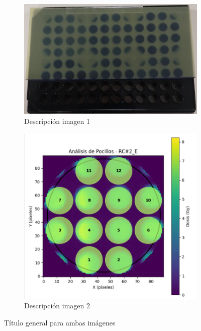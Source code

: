 \documentclass[onecolumn,12pt]{article} %
\begin{document}
\begin{figure}[H]
    \centering
    \begin{subfigure}[b]{0.45\textwidth}
        \centering
        \includegraphics[width=\textwidth]{img_exp/pocillosconRC.png}
        \caption{Descripción imagen 1}
        \label{fig:img1}
    \end{subfigure}
    \hfill
    \begin{subfigure}[b]{0.5\textwidth}
        \centering
        \includegraphics[width=\textwidth]{img_exp/AnaPocillos.png}
        \caption{Descripción imagen 2}
        \label{fig:img2}
    \end{subfigure}
    \caption{Título general para ambas imágenes}
    \label{fig:ambas}
\end{figure}
\end{document}
